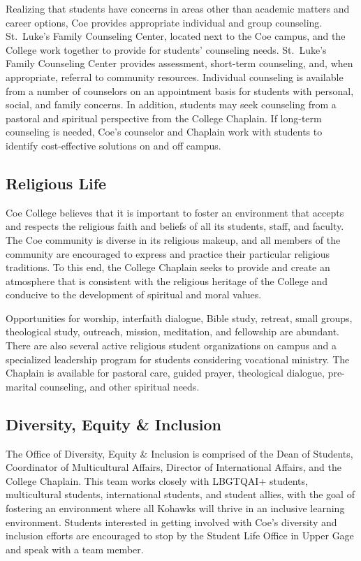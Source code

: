 \documentclass[
  letterpaper,
]{scrbook}
\begin{document}
Realizing that students have concerns in areas other than academic
matters and career options, Coe provides appropriate individual and
group counseling. St.~Luke's Family Counseling Center, located next to
the Coe campus, and the College work together to provide for students'
counseling needs. St.~Luke's Family Counseling Center provides
assessment, short-term counseling, and, when appropriate, referral to
community resources. Individual counseling is available from a number of
counselors on an appointment basis for students with personal, social,
and family concerns. In addition, students may seek counseling from a
pastoral and spiritual perspective from the College Chaplain. If
long-term counseling is needed, Coe's counselor and Chaplain work with
students to identify cost-effective solutions on and off campus.

\subsection{Religious Life}\label{religious-life}

Coe College believes that it is important to foster an environment that
accepts and respects the religious faith and beliefs of all its
students, staff, and faculty. The Coe community is diverse in its
religious makeup, and all members of the community are encouraged to
express and practice their particular religious traditions. To this end,
the College Chaplain seeks to provide and create an atmosphere that is
consistent with the religious heritage of the College and conducive to
the development of spiritual and moral values.

Opportunities for worship, interfaith dialogue, Bible study, retreat,
small groups, theological study, outreach, mission, meditation, and
fellowship are abundant. There are also several active religious student
organizations on campus and a specialized leadership program for
students considering vocational ministry. The Chaplain is available for
pastoral care, guided prayer, theological dialogue, pre-marital
counseling, and other spiritual needs.

\subsection{Diversity, Equity \&
Inclusion}\label{diversity-equity-inclusion}

The Office of Diversity, Equity \& Inclusion is comprised of the Dean of
Students, Coordinator of Multicultural Affairs, Director of
International Affairs, and the College Chaplain. This team works closely
with LBGTQAI+ students, multicultural students, international students,
and student allies, with the goal of fostering an environment where all
Kohawks will thrive in an inclusive learning environment. Students
interested in getting involved with Coe's diversity and inclusion
efforts are encouraged to stop by the Student Life Office in Upper Gage
and speak with a team member.
\end{document}
